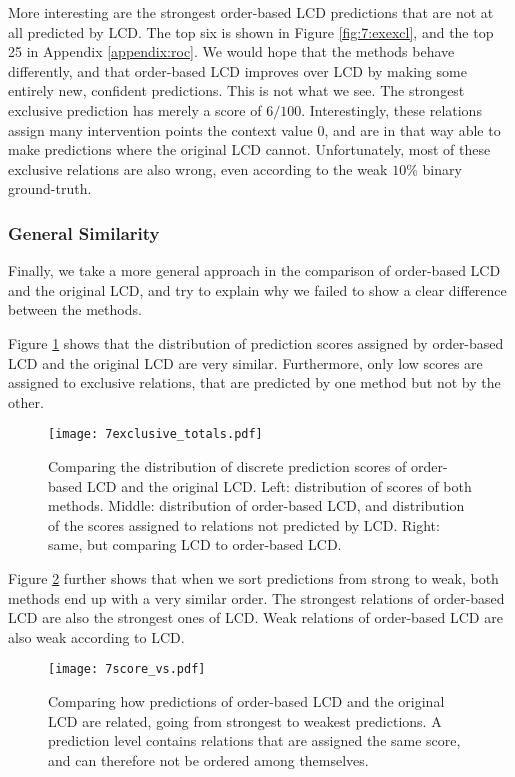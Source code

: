 More interesting are the strongest order-based LCD predictions that are not at all predicted by LCD. The top six is shown in Figure \ref{fig:7:exexcl}, and the top 25 in Appendix \ref{appendix:roc}. We would hope that the methods behave differently, and that order-based LCD improves over LCD by making some entirely new, confident predictions. This is not what we see. The strongest exclusive prediction has merely a score of $6/100$. Interestingly, these relations assign many intervention points the context value $0$, and are in that way able to make predictions where the original LCD cannot. Unfortunately, most of these exclusive relations are also wrong, even according to the weak $10\%$ binary ground-truth. 


\subsubsection{General Similarity}

Finally, we take a more general approach in the comparison of order-based LCD and the original LCD, and try to explain why we failed to show a clear difference between the methods. 

Figure \ref{fig:7:excltotals} shows that the distribution of prediction scores assigned by order-based LCD and the original LCD are very similar. Furthermore, only low scores are assigned to exclusive relations, that are predicted by one method but not by the other. 

\begin{figure}[h]
    \centering
    \texttt{[image: 7exclusive\_totals.pdf]}
    \caption{Comparing the distribution of discrete prediction scores of order-based LCD and the original LCD. Left: distribution of scores of both methods. Middle: distribution of order-based LCD, and distribution of the scores assigned to relations not predicted by LCD. Right: same, but comparing LCD to order-based LCD.}
    \label{fig:7:excltotals}
\end{figure}

Figure \ref{fig:7:scorevs} further shows that when we sort predictions from strong to weak, both methods end up with a very similar order. The strongest relations of order-based LCD are also the strongest ones of LCD. Weak relations of order-based LCD are also weak according to LCD. 

\begin{figure}[h]
    \centering
    \texttt{[image: 7score\_vs.pdf]}
    \caption{Comparing how predictions of order-based LCD and the original LCD are related, going from strongest to weakest predictions. A prediction level contains relations that are assigned the same score, and can therefore not be ordered among themselves.}
    \label{fig:7:scorevs}
\end{figure}

